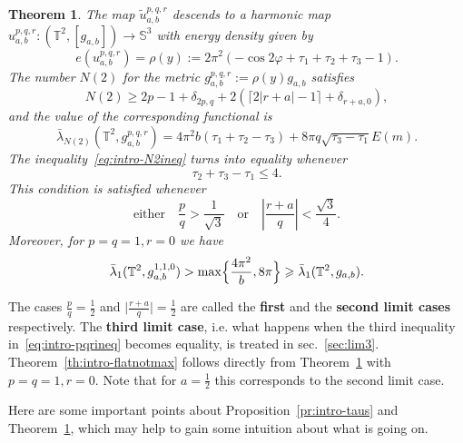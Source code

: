 \documentclass{amsart}
\let\le\leqslant
\let\ge\geqslant
\let\phi\varphi
\theoremstyle{plain}
\newtheorem{theorem}{Theorem}
\theoremstyle{definition}
\theoremstyle{remark}
\begin{document}
\begin{theorem}\label{th:intro-main}
The map \(\tilde u_{a,b}^{p,q,r}\) descends to a harmonic map
\(u_{a,b}^{p,q,r}\colon (\mathbb T^2,[g_{a,b}])\to\mathbb S^3\) with energy
density given by
\[
e(u_{a,b}^{p,q,r})=\rho(y):=2\pi^2(-\cos 2\phi+\tau_1+\tau_2+\tau_3-1).
\]
The number \(N(2)\) for the metric \(g_{a,b}^{p,q,r}:=\rho(y)g_{a,b}\) satisfies
\begin{equation}\label{eq:intro-N2ineq}
N(2)\ge 2p-1+\delta_{2p,q}+2(\lceil
2|r+a|-1\rceil+\delta_{r+a,0}),
\end{equation}
and the value of the corresponding functional is
\begin{equation}\label{eq:intro-barlval}
\bar\lambda_{N(2)}(\mathbb T^2,g_{a,b}^{p,q,r})=4\pi^2 b(\tau_1+\tau_2-\tau_3)+
8\pi q\sqrt{\tau_3-\tau_1}E(m).
\end{equation}
The inequality~\eqref{eq:intro-N2ineq} turns into equality whenever
\begin{equation}\label{eq:intro-N2eqsc}
\tau_2+\tau_3-\tau_1\le 4.
\end{equation}
This condition is satisfied whenever
\begin{equation}\label{eq:intro-N2eqscsc}
\text{either}\quad
\frac{p}q>\frac{1}{\sqrt 3}\quad\text{or}\quad
\left|\frac{r+a}q\right|<\frac{\sqrt 3}4.
\end{equation}
Moreover, for \(p=q=1,r=0\) we have
\begin{equation}\label{eq:intro-barlineq}
\bar\lambda_1(\mathbb T^2,g_{a,b}^{1,1,0})>\max\Bigl\{\frac{4\pi^2}b,
8\pi\Bigr\}\ge
\bar\lambda_1(\mathbb T^2,g_{a,b}).
\end{equation}
\end{theorem}

The cases \(\frac{p}q=\frac{1}2\) and \(\bigl|\frac{r+a}q\bigr|=\frac{1}2\) are
called the \textbf{first} and the \textbf{second limit cases} respectively. The
\textbf{third limit case}, i.e. what happens when the third inequality
in~\eqref{eq:intro-pqrineq} becomes equality, is treated in sec.~\ref{sec:lim3}.
Theorem~\ref{th:intro-flatnotmax} follows directly from
Theorem~\ref{th:intro-main} with \(p=q=1,r=0\). Note that for \(a=\frac{1}2\)
this corresponds to the second limit case.

Here are some important points about Proposition~\ref{pr:intro-taus} and
Theorem~\ref{th:intro-main}, which may help to gain some intuition about what is
going on.
\end{document}

